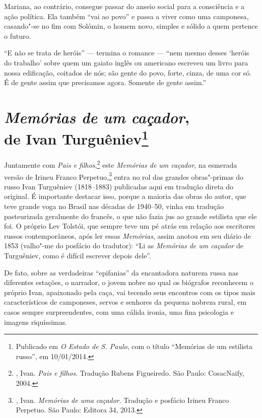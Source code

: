 Mariana, ao contrário, consegue passar do anseio social para a consciência e a ação política. Ela também ``vai ao povo'' e passa a
viver como uma camponesa, casando"-se no fim com Solómin, o homem novo, simples e sólido a quem pertence o futuro.

``E não se trata de heróis'' --- termina o romance --- ``nem mesmo desses `heróis do trabalho' sobre quem um gaiato inglês ou americano escreveu um livro para nossa edificação, coitados de nós; são gente do povo, forte, cinza, de uma cor só. É de gente assim que precisamos agora. Somente de gente assim.''

\chapter{\emph{Memórias de um caçador},\\ de Ivan Turguêniev\footnote{Publicado em \emph{O Estado de S. Paulo}, com o título ``Memórias de um estilista russo'', em 10/01/2014.}}
\label{memoriascacador}

Juntamente com \emph{Pais e filhos},\footnote{, Ivan. \emph{Pais e filhos}. Tradução Rubens Figueiredo. São Paulo: CosacNaify, 2004.} este \emph{Memórias de um caçador}, na esmerada
versão de Irineu Franco Perpetuo,\footnote{, Ivan. \emph{Memórias de uma caçador}. Tradução e posfácio Irineu Franco Perpetuo. São Paulo: Editora 34, 2013.} entra no rol das grandes
obras"-primas do russo Ivan Turguêniev (1818--1883) publicadas aqui em tradução direta do original. É importante destacar isso, porque a
maioria das obras do autor, que teve grande voga no Brasil nas décadas de 1940--50, vinha em tradução pasteurizada geralmente do francês, o que não fazia jus ao grande estilista que ele foi. O próprio Lev Tolstói,
que sempre teve um pé atrás em relação aos escritores russos contemporâneos, após ler essas \emph{Memórias}, assim anotou em seu
diário de 1853 (valho"-me do posfácio do tradutor): ``Li as \emph{Memórias de um caçador} de Turguêniev, como é difícil escrever depois dele''.

De fato, sobre as verdadeiras ``epifanias'' da encantadora natureza russa nas diferentes estações, o narrador, o jovem nobre no qual os biógrafos reconhecem o próprio Ivan, apaixonado pela caça, vai tecendo seus encontros com os tipos mais característicos de camponeses, servos e senhores da pequena nobreza rural, em casos sempre surpreendentes, com uma cálida ironia, uma fina psicologia e imagens riquíssimas.

